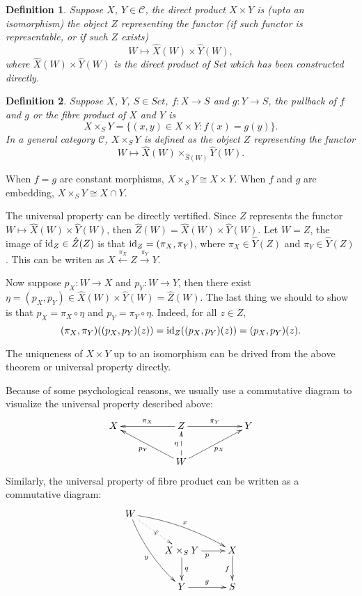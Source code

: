 \documentclass[10pt]{article}
\theoremstyle{plain}
\newtheorem{defi}{Definition}
\newcommand{\cc}{\mathcal{C}}
\begin{document}
\begin{defi}
	Suppose $X$, $Y\in\cc$, the direct product $X\times Y$ is (upto an isomorphism) the object $Z$ representing the functor (if such functor is representable, or if such $Z$ exists)
	\[
		W\mapsto \hat{X}(W)\times\hat{Y}(W),
	\]
	where $\hat{X}(W)\times\hat{Y}(W)$ is the direct product of \textit{Set} which has been constructed directly.
\end{defi}
\begin{defi}
	Suppose $X$, $Y$, $S\in\textit{Set}$, $f:X\to S$ and $g:Y\to S$, the pullback of $f$ and $g$ or the fibre product of $X$ and $Y$ is
	\[
		X\times_S Y=\{(x,y)\in X\times Y:f(x)=g(y)\}.
	\]
	In a general category $\cc$, $X\times_SY$ is defined as the object $Z$ representing the functor
	\[
		W\mapsto \hat{X}(W)\times_{\hat{S}(W)}\hat{Y}(W).
	\]
\end{defi}
When $f=g$ are constant morphisms, $X\times_S Y\cong X\times Y$. When $f$ and $g$ are embedding, $X\times_S Y\cong X\cap Y$.

The universal property can be directly vertified. Since $Z$ represents the functor $W\mapsto \hat{X}(W)\times\hat{Y}(W)$, then $\hat{Z}(W)=\hat{X}(W)\times\hat{Y}(W)$. Let $W=Z$, the image of $\operatorname{id}_Z\in \hat{Z}(Z)$ is that $\operatorname{id}_Z=(\pi_X,\pi_Y)$, where $\pi_X\in \hat{Y}(Z)$ and $\pi_Y\in \hat{Y}(Z)$. This can be writen as
$X\xleftarrow{\pi_X} Z \xrightarrow{\pi_Y}Y$.

Now suppose $p_X:W\to X$ and $p_Y:W\to Y$, then there exist $\eta=(p_X,p_Y)\in \hat{X}(W)\times\hat{Y}(W)= \hat{Z}(W)$. The last thing we should to show is that $p_X=\pi_X\circ \eta$ and $p_Y=\pi_Y\circ \eta$. Indeed, for all $z\in Z$,
\[
	(\pi_X,\pi_Y)((p_X,p_Y)(z))=\operatorname{id}_Z((p_X,p_Y)(z))=(p_X,p_Y)(z).
\]

The uniqueness of $X\times Y$ up to an isomorphism can be drived from the above theorem or universal property directly. 

Because of some psychological reasons, we usually use a commutative diagram to visualize the universal property described above:
\[
\begin{xy}
	\xymatrix
	{
		X &&\ar[ll]_{\pi_X}Z\ar[rr]^{\pi_Y}&&Y \\
		&&\ar[urr]_{p_X}W\ar@{-->}[u]^{\eta}\ar[ull]^{p_Y}&&
	}
\end{xy}
\]
Similarly, the universal property of fibre product can be written as a commutative diagram:
\[
\begin{xy}
	\xymatrix{
		W \ar@/_/[ddr]_y \ar@{.>}[dr]|{\varphi} \ar@/^/[drr]^x \\  
	 	& X \times_S Y \ar[d]^q \ar[r]_p & X \ar[d]_f \\
	 	& Y \ar[r]^g & S
	}
\end{xy}
\]
\end{document}

